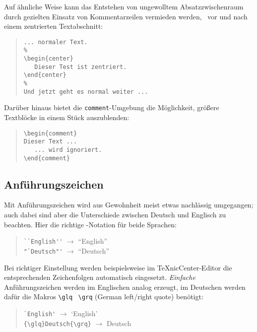\begin{sloppypar}
\noindent
Auf ähnliche Weise kann das Entstehen von ungewolltem Absatz\-zwischenraum durch 
gezielten Einsatz von Kommentarzeilen vermieden werden, \zB\ vor und nach einem zentrierten
Textabschnitt:
\end{sloppypar}
%
\begin{quote}
\begin{verbatim}
... normaler Text.
%
\begin{center}
   Dieser Test ist zentriert.
\end{center}
%
Und jetzt geht es normal weiter ...
\end{verbatim}
\end{quote}
%
Darüber hinaus bietet die \verb!comment!-Umgebung die Möglichkeit, größere Text\-blöcke
in einem Stück auszublenden:
%
\begin{quote}
\begin{verbatim}
\begin{comment}
Dieser Text ...
   ... wird ignoriert.
\end{comment}
\end{verbatim}
\end{quote}




\subsection{Anführungszeichen}
\label{sec:anfuehrungszeichen}

Mit Anführungszeichen wird aus Gewohnheit meist etwas
nachlässig umgegangen; auch dabei sind aber die Unterschiede zwischen Deutsch
und Englisch zu beachten. Hier die richtige \latex-Notation für
beide Sprachen:
%
\begin{quote}
\verb!``English''! $\rightarrow$ ``English'' \\
\verb!"`Deutsch"'! $\rightarrow$ "`Deutsch"' 
\end{quote}
%
Bei richtiger Einstellung werden beispielsweise im TeXnicCenter-Editor
die entsprechenden Zeichenfolgen automatisch eingesetzt.
\emph{Einfache} Anführungszeichen werden im Englischen analog erzeugt, im Deutschen werden dafür die Makros \verb!\glq! \bzw\ \verb!\grq! (German left/right quote) benötigt:
\begin{quote}
\verb!`English'! $\rightarrow$ `English' \\
\verb!{\glq}Deutsch{\grq}! $\rightarrow$ {\glq}Deutsch{\grq} 
\end{quote}





